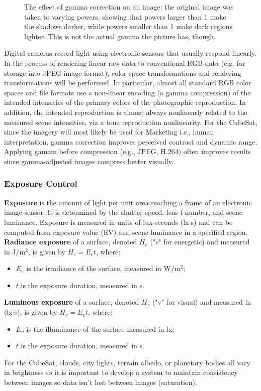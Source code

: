 \documentclass[10pt]{article}
\begin{document}
\begin{multicols}{2}
\begin{figure}[H]
    \caption{The effect of gamma correction on an image: the original image was taken to varying powers, showing that powers larger than 1 make the shadows darker, while powers smaller than 1 make dark regions lighter. This is not the actual gamma the picture has, though.}
\end{figure}
Digital cameras record light using electronic sensors that usually respond linearly. In the process of rendering linear raw data to conventional RGB data (e.g. for storage into JPEG image format), color space transformations and rendering transformations will be performed.
In particular, almost all standard RGB color spaces and file formats use a non-linear encoding (a gamma compression) of the intended intensities of the primary colors of the photographic reproduction. In addition, the intended reproduction is almost always nonlinearly related to the measured scene intensities, via a tone reproduction nonlinearity.
\newline \newline
For the CubeSat, since the imagery will most likely be used for Marketing i.e., human interpretation, gamma correction improves perceived contrast and dynamic range. Applying gamam before compression (e.g., JPEG, H.264) often improves results since gamma-adjusted images compress better visually.

\subsubsection{Exposure Control}
\textbf{Exposure} is the amount of light per unit area reaching a frame of an electronic image sensor. It is determined by the shutter speed, lens f-number, and scene luminance. Exposure is measured in units of lux-seconds (lx$\cdot$s) and can be computed from exposure value (EV) and scene luminance in a specified region.
\newline \newline
\textbf{Radiance exposure} of a surface, denoted $H_e$ ("e" for energetic) and measured in J/m$^2$, is given by $H_e=E_et$, where:
\begin{itemize}
    \item $E_e$ is the irradiance of the surface, measured in W/m$^2$;
    \item $t$ is the exposure duration, measured in s.
\end{itemize}
\textbf{Luminous exposure} of a surface, denoted $H_v$ ("v" for visual) and measured in (lx$\cdot$s), is given by $H_v=E_vt$, where:
\begin{itemize}
    \item $E_v$ is the illuminance of the surface measured in lx;
    \item $t$ is the exposure duration, measured in s.
\end{itemize}
For the CubeSat, clouds, city lights, terrain albedo, or planetary bodies all vary in brightness so it is important to develop a system to maintain consistency between images so data isn't lost between images (saturation).


\end{multicols}
\end{document}
